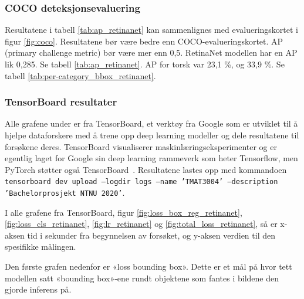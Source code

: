 \subsubsection{COCO deteksjonsevaluering} 

Resultatene i tabell \ref{tab:ap_retinanet} kan sammenlignes med evalueringskortet i figur \ref{fig:coco}. Resultatene bør være bedre enn COCO-evalueringskortet. AP (primary challenge metric) bør være mer enn 0,5. RetinaNet modellen har en AP lik 0,285. Se tabell \ref{tab:ap_retinanet}. AP for torsk var 23,1 \%, og 33,9 \%. Se tabell \ref{tab:per-category_bbox_retinanet}.



\subsubsection{TensorBoard resultater}

Alle grafene under er fra TensorBoard, et verktøy fra Google som er utviklet til å hjelpe dataforskere med å trene opp deep learning modeller og dele resultatene til forsøkene deres. TensorBoard visualiserer maskinlæringseksperimenter og er egentlig laget for Google sin deep learning rammeverk som heter Tensorflow, men PyTorch støtter også TensorBoard \cite{Oshri 2019}. Resultatene lastes opp med kommandoen \texttt{tensorboard dev upload --logdir logs --name 'TMAT3004' --description 'Bachelorprosjekt NTNU 2020'}.

I alle grafene fra TensorBoard, figur \ref{fig:loss_box_reg_retinanet}, \ref{fig:loss_cls_retinanet}, \ref{fig:lr_retinanet} og \ref{fig:total_loss_retinanet}, så er x-aksen tid i sekunder fra begynnelsen av forsøket, og y-aksen verdien til den spesifikke målingen.

Den første grafen nedenfor er «loss bounding box». Dette er et mål på hvor tett modellen satt «bounding box»-ene rundt objektene som fantes i bildene den gjorde inferens på.

